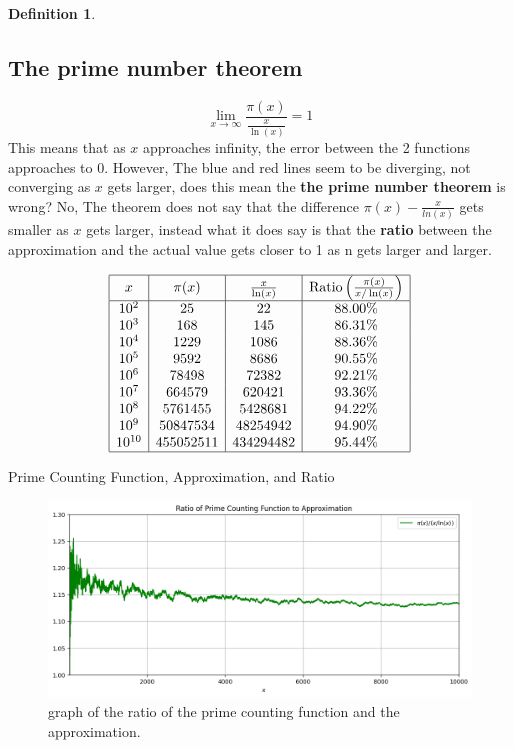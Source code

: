 \documentclass[12pt]{amsart} %
\theoremstyle{definition}
\newtheorem{definition}[thm]{Definition}
\theoremstyle{remark}
\numberwithin{equation}{section}
\begin{document}
\begin{definition}
\subsection{The prime number theorem}
$$\lim_{x\rightarrow\infty}\frac{\pi(x)}{\frac{x}{\ln(x)}} = 1$$
This means that as $x$ approaches infinity, the error between the 2 functions approaches to 0. However, The blue and red lines seem to be diverging, not converging as $x$ gets larger, does this mean the \textbf{the prime number theorem} is wrong? No, The theorem does not say that the difference $\pi(x) - \frac{x}{ln(x)}$ gets smaller as $x$ gets larger, instead what it does say is that the \textbf{ratio} between the approximation and the actual value gets closer to 1 as n gets larger and larger.
\begin{table}[h!]
\centering
\label{tab:prime_counting_ratio}
\[
\begin{array}{|c|c|c|c|}
\hline
x & \pi(x) & \frac{x}{\ln(x)} & \text{Ratio} \left(\frac{\pi(x)}{x/\ln(x)}\right) \\
\hline
10^2 & 25 & 22 & 88.00\% \\
10^3 & 168 & 145 & 86.31\% \\
10^4 & 1229 & 1086 & 88.36\% \\
10^5 & 9592 & 8686 & 90.55\% \\
10^6 & 78498 & 72382 & 92.21\% \\
10^7 & 664579 & 620421 & 93.36\% \\
10^8 & 5761455 & 5428681 & 94.22\% \\
10^9 & 50847534 & 48254942 & 94.90\% \\
10^{10} & 455052511 & 434294482 & 95.44\% \\
\hline
\end{array}
\]
\caption{Prime Counting Function, Approximation, and Ratio}

\end{table}


\begin{figure}[h!]
    \centering
    \includegraphics[width=0.8\linewidth]{../Images/ratio}
    \caption{graph of the ratio of the prime counting function and the approximation. }
    \label{fig:euler_zeta}
\end{figure}

\end{definition}
\newpage
\end{document}
